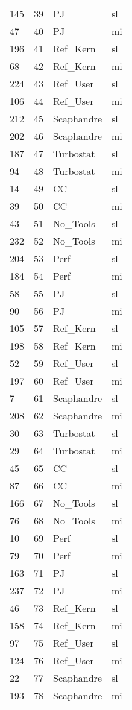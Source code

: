 \begin{tabular}{lrll}
145 & 39 & PJ & sl \\
47 & 40 & PJ & mi \\
196 & 41 & Ref_Kern & sl \\
68 & 42 & Ref_Kern & mi \\
224 & 43 & Ref_User & sl \\
106 & 44 & Ref_User & mi \\
212 & 45 & Scaphandre & sl \\
202 & 46 & Scaphandre & mi \\
187 & 47 & Turbostat & sl \\
94 & 48 & Turbostat & mi \\
14 & 49 & CC & sl \\
39 & 50 & CC & mi \\
43 & 51 & No_Tools & sl \\
232 & 52 & No_Tools & mi \\
204 & 53 & Perf & sl \\
184 & 54 & Perf & mi \\
58 & 55 & PJ & sl \\
90 & 56 & PJ & mi \\
105 & 57 & Ref_Kern & sl \\
198 & 58 & Ref_Kern & mi \\
52 & 59 & Ref_User & sl \\
197 & 60 & Ref_User & mi \\
7 & 61 & Scaphandre & sl \\
208 & 62 & Scaphandre & mi \\
30 & 63 & Turbostat & sl \\
29 & 64 & Turbostat & mi \\
45 & 65 & CC & sl \\
87 & 66 & CC & mi \\
166 & 67 & No_Tools & sl \\
76 & 68 & No_Tools & mi \\
10 & 69 & Perf & sl \\
79 & 70 & Perf & mi \\
163 & 71 & PJ & sl \\
237 & 72 & PJ & mi \\
46 & 73 & Ref_Kern & sl \\
158 & 74 & Ref_Kern & mi \\
97 & 75 & Ref_User & sl \\
124 & 76 & Ref_User & mi \\
22 & 77 & Scaphandre & sl \\
193 & 78 & Scaphandre & mi \\

\end{tabular}
